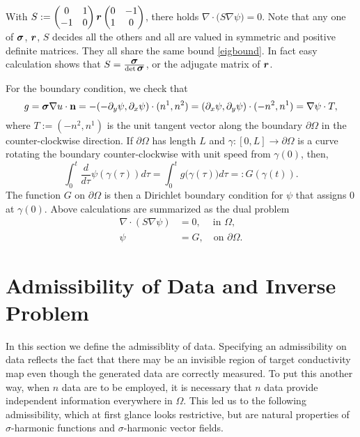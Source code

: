 \documentclass[11pt]{amsart}
\theoremstyle{plain}
\theoremstyle{remark}
\numberwithin{equation}{section}
\numberwithin{Thm}{section}
\def\r{{\bf r}}
\def\n{{\bf n}}
\def\Sigma{\mbox{\boldmath$\sigma$}}
\def\r{\mbox{\boldmath$r$}}
\begin{document}
With $S := \begin{pmatrix} 0 & 1 \\ -1 & 0 \end{pmatrix} \r \begin{pmatrix} 0 & -1 \\ 1 & 0 \end{pmatrix}$, there holds $\nabla \cdot \big(S \nabla \psi) = 0$. Note that any one of $\Sigma$, $\r$, $S$ decides all the others and all are valued in symmetric and positive definite matrices. They all share the same bound \eqref{eigbound}. In fact easy calculation shows that $S= \frac{\Sigma}{\det \Sigma}$, or the adjugate matrix of $\r$. 

For the boundary condition, we check that 
$$
g = \Sigma\nabla u \cdot \n= -(-\partial_y \psi, \partial_x \psi) \cdot (n^1,n^2) =(\partial_x \psi,\partial_y \psi) \cdot (-n^2,n^1) = \nabla \psi\cdot T,
$$
where $T:=(-n^2,n^1)$ is the unit tangent vector along the boundary $\partial\Omega$ in the counter-clockwise direction. If $\partial\Omega$ has length $L$ and $\gamma: [0, L] \to \partial\Omega$ is a curve rotating the boundary counter-clockwise with unit speed from $\gamma(0)$, then, 
$$
\int_0^t \frac{d}{d\tau} \psi(\gamma(\tau)) d\tau = \int_0^t g\big(\gamma(\tau)\big) d\tau
=:G(\gamma(t)).
$$
The function $G$ on $\partial\Omega$ is then a Dirichlet boundary condition for $\psi$ that assigns $0$ at $\gamma(0)$. Above calculations are summarized as the dual problem 
\begin{align}
 \nabla\cdot(S\nabla \psi)  &=0,\ \quad \text{in $\Omega$}, \label{eqn:div2}\\
 \psi&=G, \quad \text{on $\partial\Omega$}.                \label{eqn:div2Nbdry}
\end{align}

\section{Admissibility of Data and Inverse Problem} \label{sec:adm}

In this section we define the admissiblity of data. Specifying an admissibility on data reflects the fact that there may be an invisible region of target conductivity map even though the generated data are correctly measured. To put this another way, when $n$ data are to be employed, it is necessary that $n$ data provide independent information everywhere in $\Omega$. This led us to the following admissibility, which at first glance looks restrictive, but are natural properties of $\sigma$-harmonic functions and $\sigma$-harmonic vector fields. 
\end{document}
